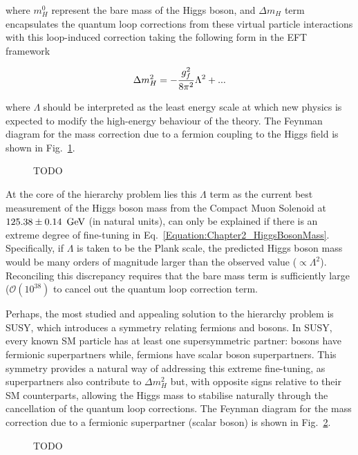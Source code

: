 where $m_H^0$ represent the bare mass of the Higgs boson, and $\Delta m_H$ term encapsulates the quantum loop corrections from these virtual particle interactions with this loop-induced correction taking the following form in the EFT framework

\begin{equation}
    \Delta m_H^2 = -\frac{g_f^2}{8\pi^2}\Lambda^2 + \space \text{...}
\end{equation}

where $\Lambda$ should be interpreted as the least energy scale at which new physics is expected to modify the high-energy behaviour of the theory. The Feynman diagram for the mass correction due to a fermion coupling to the Higgs field is shown in Fig.~\ref{Figure:Chapter2_Hierarchy_Feynman1}.

\begin{figure}[h]
\centering

\caption{TODO}
\label{Figure:Chapter2_Hierarchy_Feynman1}
\end{figure}

At the core of the hierarchy problem lies this $\Lambda$ term as the current best measurement of the Higgs boson mass from the Compact Muon Solenoid at $125.38 \pm 0.14~\,\text{Ge\hspace{-.08em}V}$ (in natural units), can only be explained if there is an extreme degree of fine-tuning in Eq.~\ref{Equation:Chapter2_HiggsBosonMass}. Specifically, if $\Lambda$ is taken to be the Plank scale, the predicted Higgs boson mass would be many orders of magnitude larger than the observed value ($\propto \Lambda^2$). Reconciling this discrepancy requires that the bare mass term is sufficiently large ($\mathcal{O}(10^{38})$ to cancel out the quantum loop correction term.

Perhaps, the most studied and appealing solution to the hierarchy problem is \ac{SUSY}, which introduces a symmetry relating fermions and bosons. In SUSY, every known SM particle has at least one supersymmetric partner: bosons have fermionic superpartners while, fermions have scalar boson superpartners. This symmetry provides a natural way of addressing this extreme fine-tuning, as superpartners also contribute to $\Delta m_H^2$ but, with opposite signs relative to their SM counterparts, allowing the Higgs mass to stabilise naturally through the cancellation of the quantum loop corrections. The Feynman diagram for the mass correction due to a fermionic superpartner (scalar boson) is shown in Fig.~\ref{Figure:Chapter2_Hierarchy_Feynman2}.

\begin{figure}[h]
\centering

\caption{TODO}
\label{Figure:Chapter2_Hierarchy_Feynman2}
\end{figure}

